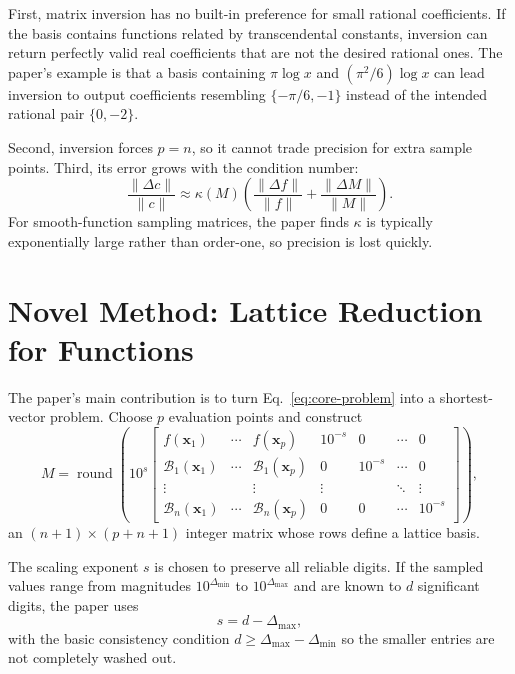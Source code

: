 \documentclass[11pt]{article}
\newcommand{\cB}{\mathcal{B}}
\newcommand{\bx}{\mathbf{x}}
\begin{document}
First, matrix inversion has no built-in preference for small rational coefficients. If the basis contains functions related by transcendental constants, inversion can return perfectly valid real coefficients that are not the desired rational ones. The paper's example is that a basis containing $\pi \log x$ and $(\pi^2/6)\log x$ can lead inversion to output coefficients resembling $\{-\pi/6,-1\}$ instead of the intended rational pair $\{0,-2\}$.

Second, inversion forces $p=n$, so it cannot trade precision for extra sample points. Third, its error grows with the condition number:
\begin{equation}
\frac{\|\Delta c\|}{\|c\|}\approx \kappa(M)\left(\frac{\|\Delta f\|}{\|f\|}+\frac{\|\Delta M\|}{\|M\|}\right).
\label{eq:error-prop}
\end{equation}
For smooth-function sampling matrices, the paper finds $\kappa$ is typically exponentially large rather than order-one, so precision is lost quickly.

\section{Novel Method: Lattice Reduction for Functions}
The paper's main contribution is to turn Eq.~\eqref{eq:core-problem} into a shortest-vector problem. Choose $p$ evaluation points and construct
\begin{equation}
M=\operatorname{round}\!\left(
10^s
\begin{bmatrix}
f(\bx_1) & \cdots & f(\bx_p) & 10^{-s} & 0 & \cdots & 0 \\
\cB_1(\bx_1) & \cdots & \cB_1(\bx_p) & 0 & 10^{-s} & \cdots & 0 \\
\vdots & & \vdots & \vdots & & \ddots & \vdots \\
\cB_n(\bx_1) & \cdots & \cB_n(\bx_p) & 0 & 0 & \cdots & 10^{-s}
\end{bmatrix}
\right),
\label{eq:lattice-matrix}
\end{equation}
an $(n+1)\times(p+n+1)$ integer matrix whose rows define a lattice basis.

The scaling exponent $s$ is chosen to preserve all reliable digits. If the sampled values range from magnitudes $10^{\Delta_{\min}}$ to $10^{\Delta_{\max}}$ and are known to $d$ significant digits, the paper uses
\begin{equation}
s=d-\Delta_{\max},
\label{eq:s-choice}
\end{equation}
with the basic consistency condition $d\ge \Delta_{\max}-\Delta_{\min}$ so the smaller entries are not completely washed out.
\end{document}
